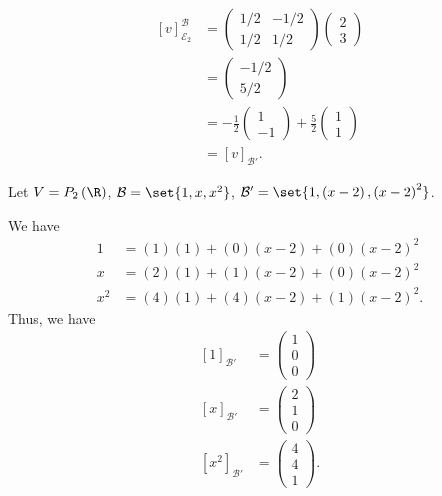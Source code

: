 \documentclass[10pt]{mypackage}
\begin{document}
\begin{example}
\begin{align*}
    \left[v\right]_{\mathcal{E}_2}^{\mathcal{B}} &= \begin{pmatrix}1/2 & -1/2 \\ 1/2 & 1/2\end{pmatrix} \begin{pmatrix}2\\3\end{pmatrix}\\
                                                 &= \begin{pmatrix}-1/2\\5/2\end{pmatrix}\\
                                                 &= -\frac{1}{2} \begin{pmatrix}1\\-1\end{pmatrix} + \frac{5}{2} \begin{pmatrix}1\\1\end{pmatrix}\\
                                                 &= \left[v\right]_{\mathcal{B}'}.
  \end{align*}
\end{example}
\begin{example}
  Let $V = P_2\left(\R\right)$, $\mathcal{B} = \set{1,x,x^2}$, $\mathcal{B}' = \set{1,\left(x-2\right),\left(x-2\right)^2}$.
\end{example}
We have
\begin{align*}
  1 &= (1)(1) + (0)\left(x-2\right) + (0)\left(x-2\right)^2\\
  x &= (2)(1) + (1)\left(x-2\right) + (0)\left(x-2\right)^2\\
  x^2 &= (4)(1) + (4)\left(x-2\right) + (1)\left(x-2\right)^2.
\end{align*}
Thus, we have
\begin{align*}
  \left[1\right]_{\mathcal{B}'} &= \begin{pmatrix}1\\0\\0\end{pmatrix}\\
  \left[x\right]_{\mathcal{B}'} &= \begin{pmatrix}2\\1\\0\end{pmatrix}\\
  \left[x^2\right]_{\mathcal{B}'} &= \begin{pmatrix}4\\4\\1\end{pmatrix}.
\end{align*}
\end{document}
